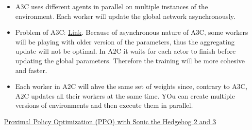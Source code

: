 \begin{itemize}[noitemsep,nolistsep]
	\item A3C uses different agents in parallel on multiple instances of the environment. Each worker will update the global network asynchronously.
	\item Problem of A3C: \href{https://lilianweng.github.io/lil-log/2018/04/08/policy-gradient-algorithms.html#a2c}{Link}. Because of asynchronous nature of A3C, some workers will be playing with older version of the parameters, thus the aggregating update will not be optimal. In A2C it waits for each actor to finish before updating the global parameters. Therefore the training will be more cohesive and faster.
	\item Each worker in A2C will ahve the same set of weights since, contrary to A3C, A2C updates all their workers at the same time. YOu can create multiple versions of environments and then execute them in parallel.
\end{itemize}
\href{https://towardsdatascience.com/proximal-policy-optimization-ppo-with-sonic-the-hedgehog-2-and-3-c9c21dbed5e}{Proximal Policy Optimization (PPO) with Sonic the Hedgehog 2 and 3}

